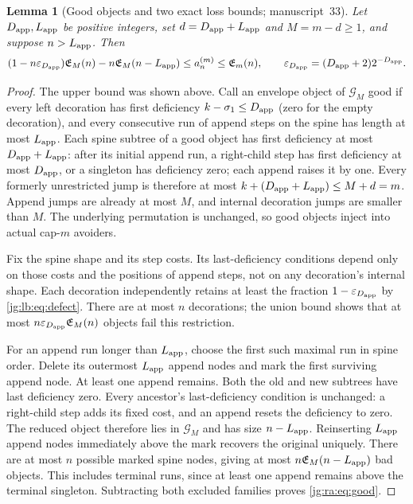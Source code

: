 \documentclass[11pt,a4paper]{article}
\newtheorem{lemma}[lemma]{Lemma}
\theoremstyle{definition}\newaliascnt{definition}{theorem}
\theoremstyle{remark}\newaliascnt{remark}{theorem}
\newcommand{\eps}{\varepsilon}
\begin{document}
\begin{lemma}[Good objects and two exact loss bounds; manuscript~33]
\label{jg:ra:lem:good}
Let $D_{\rm app},L_{\rm app}$ be positive integers, set
$d=D_{\rm app}+L_{\rm app}$ and $M=m-d\ge1$, and suppose $n>L_{\rm app}$. Then
\begin{equation}\label{jg:ra:eq:good}
 (1-n\eps_{D_{\rm app}})\mathfrak E_M(n)-n\mathfrak E_M(n-L_{\rm app})
 \le a_n^{(m)}\le\mathfrak E_m(n),
 \qquad \eps_{D_{\rm app}}=(D_{\rm app}+2)2^{-D_{\rm app}}.
\end{equation}
\end{lemma}
\begin{proof}
The upper bound was shown above. Call an envelope object of $\mathcal G_M$
good if every left decoration has first deficiency $k-\sigma_1\le D_{\rm app}$
(zero for the empty decoration), and every consecutive run of append steps on
the spine has length at most $L_{\rm app}$. Each spine subtree of a good object
has first deficiency at most $D_{\rm app}+L_{\rm app}$: after its initial
append run, a right-child step has first deficiency at most $D_{\rm app}$, or a
singleton has deficiency zero; each append raises it by one. Every formerly
unrestricted jump is therefore at most $k+(D_{\rm app}+L_{\rm app})\le M+d=m$.
Append jumps are already at most $M$, and internal decoration jumps are smaller
than $M$. The underlying permutation is unchanged, so good objects inject into
actual cap-$m$ avoiders.

Fix the spine shape and its step costs. Its last-deficiency conditions depend
only on those costs and the positions of append steps, not on any decoration's
internal shape. Each decoration independently retains at least the fraction
$1-\eps_{D_{\rm app}}$ by \eqref{jg:lb:eq:defect}. There are at most $n$
decorations; the union bound shows that at most
$n\eps_{D_{\rm app}}\mathfrak E_M(n)$ objects fail this restriction.

For an append run longer than $L_{\rm app}$, choose the first such maximal run
in spine order. Delete its outermost $L_{\rm app}$ append nodes and mark the
first surviving append node. At least one append remains. Both the old and new
subtrees have last deficiency zero. Every ancestor's last-deficiency condition
is unchanged: a right-child step adds its fixed cost, and an append resets the
deficiency to zero. The reduced object therefore lies in $\mathcal G_M$ and has
size $n-L_{\rm app}$. Reinserting $L_{\rm app}$ append nodes immediately above
the mark recovers the original uniquely. There are at most $n$ possible marked
spine nodes, giving at most $n\mathfrak E_M(n-L_{\rm app})$ bad objects. This
includes terminal runs, since at least one append remains above the terminal
singleton. Subtracting both excluded families proves \eqref{jg:ra:eq:good}.
\end{proof}
\end{document}
